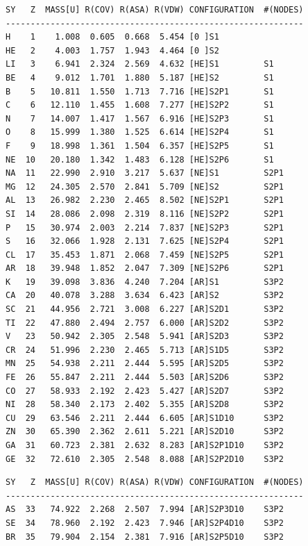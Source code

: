 \documentclass[final,12pt,makeidx,DIV=calc]{article}
\begin{document}
{{{{{{\small
\begin{verbatim}
SY   Z  MASS[U] R(COV) R(ASA) R(VDW) CONFIGURATION  #(NODES)
------------------------------------------------------------
H    1    1.008  0.605  0.668  5.454 [0 ]S1                   
HE   2    4.003  1.757  1.943  4.464 [0 ]S2                   
LI   3    6.941  2.324  2.569  4.632 [HE]S1         S1        
BE   4    9.012  1.701  1.880  5.187 [HE]S2         S1        
B    5   10.811  1.550  1.713  7.716 [HE]S2P1       S1        
C    6   12.110  1.455  1.608  7.277 [HE]S2P2       S1        
N    7   14.007  1.417  1.567  6.916 [HE]S2P3       S1        
O    8   15.999  1.380  1.525  6.614 [HE]S2P4       S1        
F    9   18.998  1.361  1.504  6.357 [HE]S2P5       S1        
NE  10   20.180  1.342  1.483  6.128 [HE]S2P6       S1        
NA  11   22.990  2.910  3.217  5.637 [NE]S1         S2P1      
MG  12   24.305  2.570  2.841  5.709 [NE]S2         S2P1      
AL  13   26.982  2.230  2.465  8.502 [NE]S2P1       S2P1      
SI  14   28.086  2.098  2.319  8.116 [NE]S2P2       S2P1      
P   15   30.974  2.003  2.214  7.837 [NE]S2P3       S2P1      
S   16   32.066  1.928  2.131  7.625 [NE]S2P4       S2P1      
CL  17   35.453  1.871  2.068  7.459 [NE]S2P5       S2P1      
AR  18   39.948  1.852  2.047  7.309 [NE]S2P6       S2P1      
K   19   39.098  3.836  4.240  7.204 [AR]S1         S3P2      
CA  20   40.078  3.288  3.634  6.423 [AR]S2         S3P2      
SC  21   44.956  2.721  3.008  6.227 [AR]S2D1       S3P2      
TI  22   47.880  2.494  2.757  6.000 [AR]S2D2       S3P2      
V   23   50.942  2.305  2.548  5.941 [AR]S2D3       S3P2      
CR  24   51.996  2.230  2.465  5.713 [AR]S1D5       S3P2      
MN  25   54.938  2.211  2.444  5.595 [AR]S2D5       S3P2      
FE  26   55.847  2.211  2.444  5.503 [AR]S2D6       S3P2      
CO  27   58.933  2.192  2.423  5.427 [AR]S2D7       S3P2      
NI  28   58.340  2.173  2.402  5.355 [AR]S2D8       S3P2      
CU  29   63.546  2.211  2.444  6.605 [AR]S1D10      S3P2      
ZN  30   65.390  2.362  2.611  5.221 [AR]S2D10      S3P2      
GA  31   60.723  2.381  2.632  8.283 [AR]S2P1D10    S3P2      
GE  32   72.610  2.305  2.548  8.088 [AR]S2P2D10    S3P2      
\end{verbatim}
\newpage
\begin{verbatim}
SY   Z  MASS[U] R(COV) R(ASA) R(VDW) CONFIGURATION  #(NODES)
------------------------------------------------------------
AS  33   74.922  2.268  2.507  7.994 [AR]S2P3D10    S3P2      
SE  34   78.960  2.192  2.423  7.946 [AR]S2P4D10    S3P2      
BR  35   79.904  2.154  2.381  7.916 [AR]S2P5D10    S3P2      

\end{verbatim}}}}}}}
\end{document}
